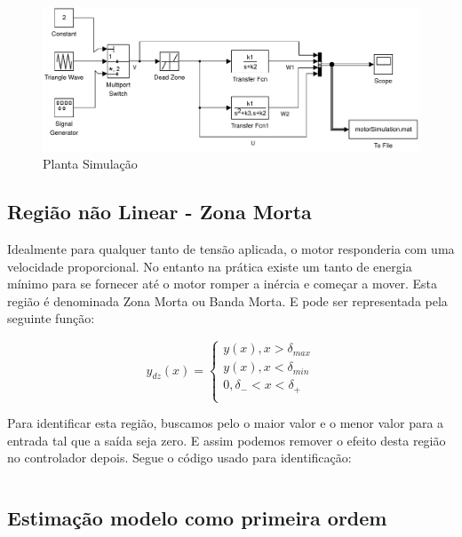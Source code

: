 \documentclass[a4paper,11pt]{article}
\begin{document}
\begin{figure}[H]
    \centering
    \includegraphics[width=1.0\linewidth]{tex/img/dcMotorSimulation.pdf}
    \caption{Planta Simulação}
    \label{fig:my_label}
\end{figure}

\subsection{Região não Linear - Zona Morta}

Idealmente para qualquer tanto de tensão aplicada, o motor responderia com uma velocidade proporcional. No entanto na prática existe um tanto de energia mínimo para se fornecer até o motor romper a inércia e começar a mover. Esta região é denominada Zona Morta ou Banda Morta. E pode ser representada pela seguinte função:

\begin{equation}
    y_{dz}(x) = 
    \left\{\begin{array}{c}
    y(x), x > \delta_{max} \\
    y(x), x < \delta_{min} \\
    0, \delta_{-} < x < \delta_{+} \\
\end{array} \right.
\end{equation}

Para identificar esta região, buscamos pelo o maior valor e o menor valor para a entrada tal que a saída seja zero. E assim podemos remover o efeito desta região no controlador depois. Segue o código usado para identificação:

\inputminted[frame=single,framesep=10pt]{matlab}{../src/matlab/deadzoneindetify.m}



\subsection{Estimação modelo como primeira ordem}
\end{document}
